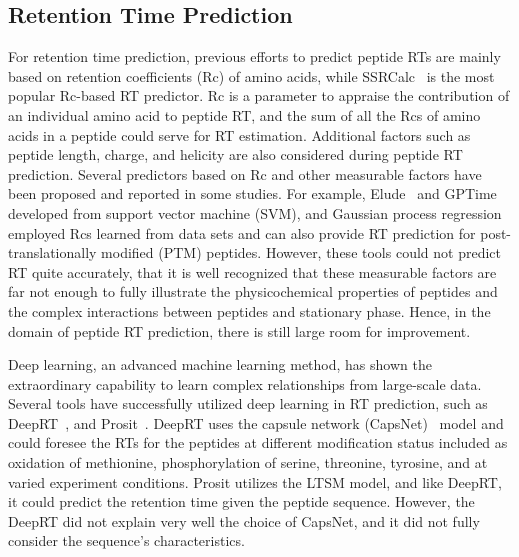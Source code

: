\subsection{Retention Time Prediction}
For retention time prediction, previous efforts to predict peptide RTs are mainly based on retention coefficients (Rc) of amino acids,
while SSRCalc~\cite{guo1986prediction} is the most popular Rc-based RT predictor. Rc is a parameter to appraise the contribution of an individual amino acid to peptide RT, and the sum of all the Rcs of amino acids in a peptide could serve for RT estimation.
Additional factors such as peptide length, charge, and helicity are also considered during peptide RT prediction.
Several predictors based on Rc and other measurable factors have been proposed and reported in some studies. For example, Elude~\cite{moruz2010training,moruz2012chromatographic} and GPTime~\cite{maboudi2017uncertainty} developed from support vector machine (SVM), and Gaussian process
regression employed Rcs learned from data sets and can also provide RT prediction for post-translationally modiﬁed (PTM) peptides. However, these tools could not predict RT quite accurately, that it is well recognized
that these measurable factors are far not enough to fully illustrate the physicochemical properties of peptides and the complex interactions between peptides and stationary phase. Hence, in the domain of peptide RT prediction, there is still large room for improvement.

Deep learning, an advanced machine learning method, has shown the extraordinary capability to learn complex relationships from large-scale data. Several tools have successfully utilized deep learning in RT prediction, such as DeepRT~\cite{ma2018improved}, and Prosit~\cite{gessulat2019prosit}. DeepRT uses the capsule network (CapsNet)~\cite{sabour2017dynamic} model and could foresee the RTs for the peptides at different modification status included as oxidation of methionine, phosphorylation of
serine, threonine, tyrosine, and at varied experiment conditions.
Prosit utilizes the LTSM model, and like DeepRT, it could predict the retention time given the peptide sequence. However, the DeepRT did not explain very well the choice of CapsNet, and it did not fully consider the sequence's characteristics. 

